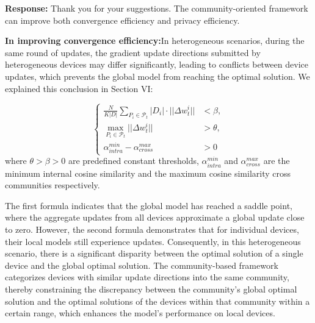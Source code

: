 \documentclass[a4paper,twoside,11pt,dvipsnames]{reviewresponse}
\begin{document}





\textbf{Response:} Thank you for your suggestions. The community-oriented framework can improve both convergence efficiency and privacy efficiency.

\textbf{In improving convergence efficiency:}In heterogeneous scenarios, during the same round of updates, the gradient update directions submitted by heterogeneous devices may differ significantly, leading to conflicts between device updates, which prevents the global model from reaching the optimal solution. We explained this conclusion in Section VI:

\color{blue}
\begin{equation}\label{eq:3conditions-og}
    \left\{
    \begin{array}{rcr}
    \frac{N}{K|D|} \sum_{P_i\in \mathcal{P}_t} |D_i| \cdot ||\Delta w^{i}_{t} || & <\beta,\\
    \max_{P_i\in \mathcal{P}_t}||\Delta w^{i}_t|| &>\theta,\\
    \alpha^{min}_{intra} - \alpha^{max}_{cross} & > 0
    \end{array}
    \right.
\end{equation}
where $\theta>\beta>0$ are predefined constant thresholds, $\alpha^{min}_{intra}$ and  $\alpha^{max}_{cross}$ are the minimum internal cosine similarity and the maximum cosine similarity cross communities respectively\color{black}.

The first formula indicates that the global model has reached a saddle point, where the aggregate updates from all devices approximate a global update close to zero. However, the second formula demonstrates that for individual devices, their local models still experience updates. Consequently, in this heterogeneous scenario, there is a significant disparity between the optimal solution of a single device and the global optimal solution. The community-based framework categorizes devices with similar update directions into the same community, thereby constraining the discrepancy between the community's global optimal solution and the optimal solutions of the devices within that community within a certain range, which enhances the model's performance on local devices.
\end{document}
